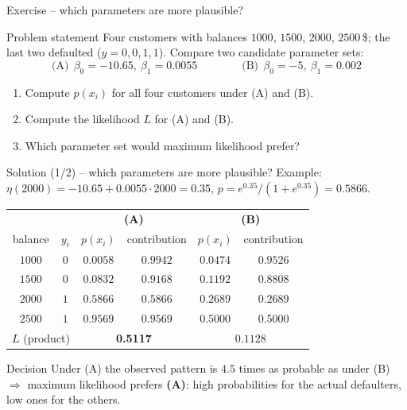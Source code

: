 \documentclass[aspectratio=169,11pt]{beamer}
\begin{document}
\begin{frame}{Exercise -- which parameters are more plausible?}
  \begin{block}{Problem statement}
    Four customers with balances $1000$, $1500$, $2000$, $2500$\,\$; the last
    two defaulted ($y=0,0,1,1$). Compare two candidate parameter sets:
    \[
      \text{(A)}\ \ \beta_0=-10.65,\ \beta_1=0.0055
      \qquad\qquad
      \text{(B)}\ \ \beta_0=-5,\ \beta_1=0.002
    \]
    \begin{enumerate}
      \item Compute $p(x_i)$ for all four customers under (A) and (B).
      \item Compute the likelihood $L$ for (A) and (B).
      \item Which parameter set would maximum likelihood prefer?
    \end{enumerate}
  \end{block}
\end{frame}

\begin{frame}{Solution (1/2) -- which parameters are more plausible?}
  Example: $\eta(2000)=-10.65+0.0055\cdot2000=0.35$,
  $p=e^{0.35}/(1+e^{0.35})=0.5866$.
  \begin{center}
    \small
    \renewcommand{\arraystretch}{1.08}
    \begin{tabular}{c|c|cc|cc}
      \toprule
      & & \multicolumn{2}{c|}{\textbf{(A)}} & \multicolumn{2}{c}{\textbf{(B)}}\\
      balance & $y_i$ & $p(x_i)$ & contribution & $p(x_i)$ & contribution\\
      \midrule
      $1000$ & $0$ & $0.0058$ & $0.9942$ & $0.0474$ & $0.9526$\\
      $1500$ & $0$ & $0.0832$ & $0.9168$ & $0.1192$ & $0.8808$\\
      $2000$ & $1$ & $0.5866$ & $0.5866$ & $0.2689$ & $0.2689$\\
      $2500$ & $1$ & $0.9569$ & $0.9569$ & $0.5000$ & $0.5000$\\
      \midrule
      \multicolumn{2}{c|}{$L$ (product)} & \multicolumn{2}{c|}{\textbf{0.5117}} & \multicolumn{2}{c}{$0.1128$}\\
      \bottomrule
    \end{tabular}
  \end{center}
  \begin{exampleblock}{Decision}
    Under (A) the observed pattern is $4.5$ times as probable as under (B)
    $\Rightarrow$ maximum likelihood prefers \textbf{(A)}: high probabilities
    for the actual defaulters, low ones for the others.
  \end{exampleblock}
\end{frame}
\end{document}
